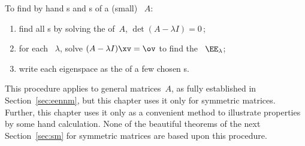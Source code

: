 \begin{procedure} \label{pro:eeh}
To find by hand s and s of a (small) ~\(A\):
\begin{enumerate}
\item find all s by solving the  of~\(A\), \(\det(A-\lambda I)=0\)\,;
\item for each ~\(\lambda\), solve \((A-\lambda I)\xv=\ov\) to find the ~\(\EE_\lambda\);
\item write each eigenspace as the  of a few chosen s.
\end{enumerate}
\end{procedure}

This procedure applies to general matrices~\(A\), as fully established in Section~\ref{sec:eennm}, but this chapter uses it only for symmetric matrices.
Further, this chapter uses it only as a convenient method to illustrate properties by some hand calculation.
None of the beautiful theorems of the next Section~\ref{sec:sm} for symmetric matrices are based upon this procedure.


